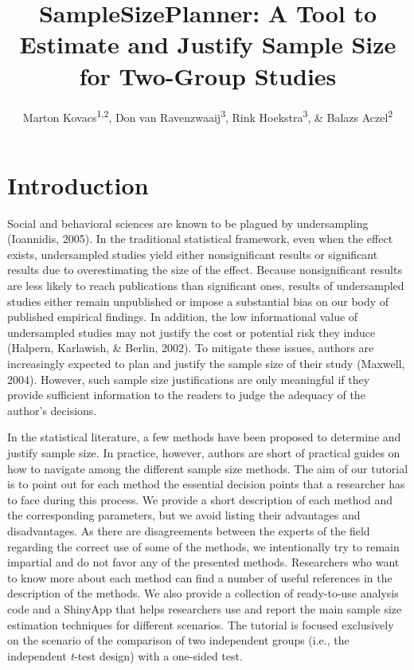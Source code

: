 \documentclass[
  english,
  man,floatsintext]{apa6}
\title{SampleSizePlanner: A Tool to Estimate and Justify Sample Size for Two-Group Studies}
\author{Marton Kovacs\textsuperscript{1,2}, Don van Ravenzwaaij\textsuperscript{3}, Rink Hoekstra\textsuperscript{3}, \& Balazs Aczel\textsuperscript{2}}
\date{}
\affiliation{\vspace{0.5cm}\textsuperscript{1} Doctoral School of Psychology, ELTE Eotvos Lorand University, Budapest, Hungary\\\textsuperscript{2} Institute of Psychology, ELTE Eotvos Lorand University, Budapest, Hungary\\\textsuperscript{3} University of Groningen, Groningen, The Netherlands}
\begin{document}
\maketitle

\hypertarget{introduction}{%
\section{Introduction}\label{introduction}}

Social and behavioral sciences are known to be plagued by undersampling (Ioannidis, 2005). In the traditional statistical framework, even when the effect exists, undersampled studies yield either nonsignificant results or significant results due to overestimating the size of the effect. Because nonsignificant results are less likely to reach publications than significant ones, results of undersampled studies either remain unpublished or impose a substantial bias on our body of published empirical findings. In addition, the low informational value of undersampled studies may not justify the cost or potential risk they induce (Halpern, Karlawish, \& Berlin, 2002). To mitigate these issues, authors are increasingly expected to plan and justify the sample size of their study (Maxwell, 2004). However, such sample size justifications are only meaningful if they provide sufficient information to the readers to judge the adequacy of the author's decisions.

In the statistical literature, a few methods have been proposed to determine and justify sample size. In practice, however, authors are short of practical guides on how to navigate among the different sample size methods. The aim of our tutorial is to point out for each method the essential decision points that a researcher has to face during this process. We provide a short description of each method and the corresponding parameters, but we avoid listing their advantages and disadvantages. As there are disagreements between the experts of the field regarding the correct use of some of the methods, we intentionally try to remain impartial and do not favor any of the presented methods. Researchers who want to know more about each method can find a number of useful references in the description of the methods. We also provide a collection of ready-to-use analysis code and a ShinyApp that helps researchers use and report the main sample size estimation techniques for different scenarios. The tutorial is focused exclusively on the scenario of the comparison of two independent groups (i.e., the independent \emph{t}-test design) with a one-sided test.
\end{document}
